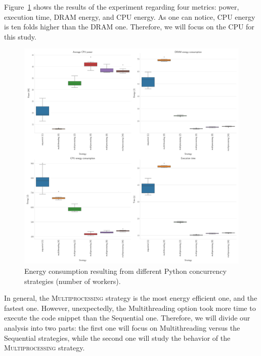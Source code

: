 Figure~\ref{fig:python_multiprocessing} shows the results of the experiment regarding four metrics: power, execution time, DRAM energy, and CPU energy.
As one can notice, CPU energy is ten folds higher than the DRAM one.
Therefore, we will focus on the CPU for this study.

\begin{figure}[!hbt]
    \centering
    \includegraphics[width=\linewidth]{imgs/python_multiprocessing}
    \caption{Energy consumption resulting from different Python concurrency strategies (number of workers).}
    \label{fig:python_multiprocessing}
\end{figure}

In general, the \textsc{Multiprocessing} strategy is the most energy efficient one, and the fastest one.
However, unexpectedly, the \textsf{Multithreading} option took more time to execute the code snippet than the \textsf{Sequential} one.
Therefore, we will divide our analysis into two parts: the first one will focus on \textsf{Multithreading} versus the \textsf{Sequential} strategies, while the second one will study the behavior of the \textsc{Multiprocessing} strategy.

